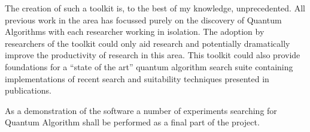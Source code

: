 The creation of such a toolkit is, to the best of my knowledge, unprecedented.
All previous work in the area has focussed purely on the discovery of Quantum Algorithms with each researcher working in isolation.
The adoption by researchers of the toolkit could only aid research and potentially dramatically improve the productivity of research in this area.
This toolkit could also provide foundations for a ``state of the art'' quantum algorithm search suite containing implementations of recent search and suitability techniques presented in publications.

As a demonstration of the software a number of experiments searching for Quantum Algorithm shall be performed as a final part of the project.




